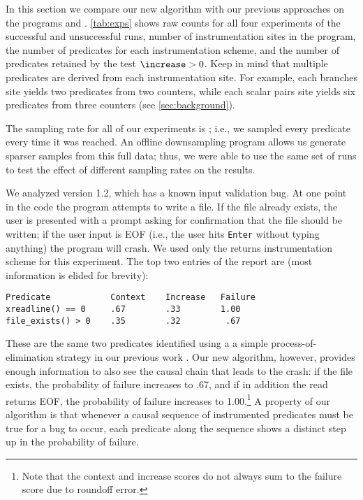 


In this section we compare our new algorithm with our previous
approaches on the programs \ccrypt and \bc.
\autoref{tab:exps} shows raw counts for all four experiments of the
successful and unsuccessful runs, number of instrumentation sites in
the program, the number of predicates for each
instrumentation scheme, and the number of predicates retained by the
test $\increase > 0$.   Keep in mind that multiple predicates are
derived from each instrumentation site.  For example, each branches
site yields two predicates from two counters, while each scalar pairs
site yields six predicates from three counters (see \autoref{sec:background}).

The sampling rate for all of our experiments is ;
i.e., we sampled every predicate every time it was reached.  An
offline downsampling program allows us generate sparser samples from this
full data; thus, we were able to use the same set of runs to test the
effect of different sampling rates on the results.  

We analyzed \ccrypt version 1.2, which has a known input validation
bug.  At one point in the code the program attempts to write a file.
If the file already exists, the user is presented with a prompt asking
for confirmation that the file should be written; if the user input is
EOF (i.e., the user hits {\tt Enter} without typing anything) the
program will crash.  We used only the returns instrumentation scheme
for this experiment.  The top two entries of the report are (most
information is elided for brevity):
\begin{verbatim}
Predicate            Context    Increase   Failure
xreadline() == 0     .67        .33        1.00
file_exists() > 0    .35        .32         .67
\end{verbatim}

These are the same two predicates identified using a a simple process-of-elimination strategy in our previous work
\cite{PLDI`03*141}.  Our new algorithm, however, provides enough information to also see the causal chain that
leads to the crash: if the file exists, the probability of failure increases to .67, and if in addition the
read returns EOF, the probability of failure increases to 1.00.\footnote{Note that the context and increase scores do not always sum to the failure score due to roundoff error.}   A property of our algorithm is that 
whenever a causal sequence of instrumented predicates must be true for a bug to occur, each predicate along the
sequence shows a distinct step up in the probability of failure.

